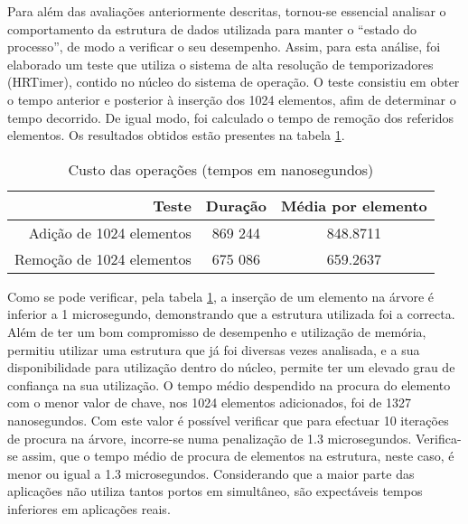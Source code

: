 Para além das avaliações anteriormente descritas, tornou-se essencial analisar o comportamento da estrutura de dados utilizada para manter o “estado do processo”, de modo a verificar o seu desempenho.
Assim, para esta análise, foi elaborado um teste que utiliza o sistema de alta resolução de temporizadores (HRTimer), contido no núcleo do sistema de operação. O teste consistiu em obter o tempo anterior e posterior à inserção dos 1024 elementos, afim de determinar o tempo decorrido.
De igual modo, foi calculado o tempo de remoção dos referidos elementos. Os resultados obtidos estão presentes na tabela \ref{tab:tree_info}.

\begin{table}[!htb]
\begin{center}
\caption{Custo das operações (tempos em nanosegundos)}
\begin{tabular}{ | r | c | c | }
\hline
\hspace{1cm} Teste \hspace{1.5cm} & \hspace{1cm}Duração\hspace{1cm} &  Média por
elemento \\
\hline
Adição de 1024 elementos & 869 244 & 848.8711 \\
\hline
Remoção de 1024 elementos & 675 086 & 659.2637\\
\hline

\hline
\end{tabular}
\label{tab:tree_info}
\end{center}
\end{table}

Como se pode verificar, pela tabela \ref{tab:tree_info}, a inserção de um elemento na árvore é inferior a 1 microsegundo, demonstrando que a estrutura utilizada foi a correcta.
Além de ter um bom compromisso de desempenho e utilização de memória, permitiu utilizar uma estrutura que já foi diversas vezes analisada, e a sua disponibilidade para utilização dentro do núcleo, permite ter um elevado grau de confiança na sua utilização.
O tempo médio despendido na procura do elemento com o menor valor de chave, nos 1024 elementos adicionados, foi de 1327 nanosegundos.
Com este valor é possível verificar que para efectuar 10 iterações de procura na árvore, incorre-se numa penalização de 1.3 microsegundos.
Verifica-se assim, que o tempo médio de procura de elementos na estrutura, neste caso, é menor ou igual a 1.3 microsegundos.
Considerando que a maior parte das aplicações não utiliza tantos portos em simultâneo, são expectáveis tempos inferiores em aplicações reais.


